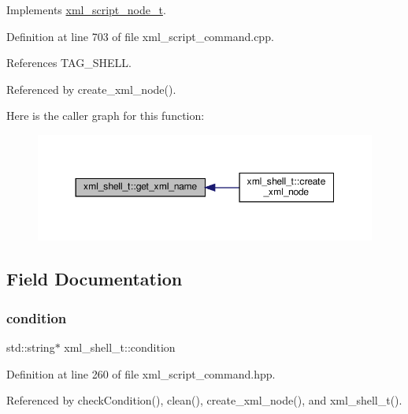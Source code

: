 Implements \hyperlink{classxml__script__node__t_af5815fab8924e5e4f47ba1b7266b6cb8}{xml\+\_\+script\+\_\+node\+\_\+t}.



Definition at line 703 of file xml\+\_\+script\+\_\+command.\+cpp.



References T\+A\+G\+\_\+\+S\+H\+E\+LL.



Referenced by create\+\_\+xml\+\_\+node().

Here is the caller graph for this function\+:
\nopagebreak
\begin{figure}[H]
\begin{center}
\leavevmode
\includegraphics[width=350pt]{dc/d20/classxml__shell__t_a5a9787981f0f16d4182a21cca3b14916_icgraph}
\end{center}
\end{figure}


\subsection{Field Documentation}
\mbox{\label{classxml__shell__t_a60466261290dff23df2f5ea3f6a988c7}} 
\subsubsection{\texorpdfstring{condition}{condition}}
{\footnotesize\ttfamily std\+::string$\ast$ xml\+\_\+shell\+\_\+t\+::condition}



Definition at line 260 of file xml\+\_\+script\+\_\+command.\+hpp.



Referenced by check\+Condition(), clean(), create\+\_\+xml\+\_\+node(), and xml\+\_\+shell\+\_\+t().

\mbox{\label{classxml__shell__t_a299caa74dd192213aae967a07a83e34f}} 
